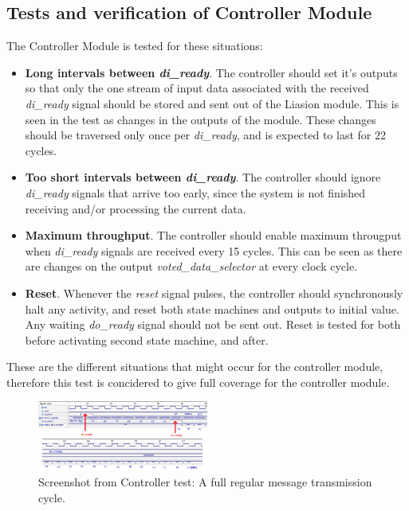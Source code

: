 \documentclass[a4paper]{IEEEtran}
\begin{document}
\subsection{ Tests and verification of Controller Module}
The Controller Module is tested for these situations:

\begin{itemize}
    \item \textbf{Long intervals between \textit{di\_ready}}. 
        The controller should set it's outputs so that only the one stream of input data associated with the received \textit{di\_ready} signal should be stored and sent out of the Liasion module.
        This is seen in the test as changes in the outputs of the module.
        These changes should be traversed only once per \textit{di\_ready}, and is expected to last for 22 cycles.
    \item \textbf{Too short intervals between \textit{di\_ready}}.
        The controller should ignore \textit{di\_ready} signals that arrive too early, since the system is not finished receiving and/or processing the current data.
    \item \textbf{Maximum throughput}.
        The controller should enable maximum througput when \textit{di\_ready} signals are received every 15 cycles.
        This can be seen as there are changes on the output \textit{voted\_data\_selector} at every clock cycle.
    \item \textbf{Reset}.
        Whenever the \textit{reset} signal pulses, the controller should synchronously halt any activity, and reset both state machines and outputs to initial value.
        Any waiting \textit{do\_ready} signal should not be sent out.
        Reset is tested for both before activating second state machine, and after. 
\end{itemize}

These are the different situations that might occur for the controller module, therefore this test is concidered to give full coverage for the controller module.

\begin{figure}[h!]
  \centering
      \includegraphics[width=0.5\textwidth]{Figures/Tests/ControllerRegular}
  \caption{Screenshot from Controller test: A full regular message transmission cycle.}
  \label{fig:ControllerRegular}
\end{figure}
\end{document}
